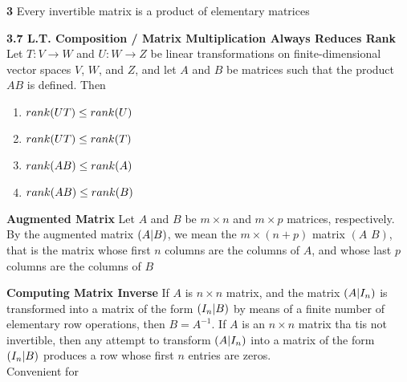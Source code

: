 \documentclass[11pt]{article}
\begin{document}
\begin{corollary*}
    \textbf{3} Every invertible matrix is a product of elementary matrices
\end{corollary*}

\begin{theorem*}
    \textbf{3.7 L.T. Composition / Matrix Multiplication Always Reduces Rank} \\
    Let $T:V\to W$ and $U:W\to Z$ be linear transformations on finite-dimensional vector spaces $V$, $W$, and $Z$, and let $A$ and $B$ be matrices such that the product $AB$ is defined. Then 
    \begin{enumerate}
        \item $rank(UT)\leq rank(U)$
        \item $rank(UT)\leq rank(T)$
        \item $rank(AB)\leq rank(A)$
        \item $rank(AB)\leq rank(B)$
    \end{enumerate}
\end{theorem*}

\begin{defn*}
    \textbf{Augmented Matrix} Let $A$ and $B$ be $m\times n$ and $m\times p$ matrices, respectively. By the augmented matrix $(A|B)$, we mean the $m\times (n+p)$ matrix $(A\,\,B)$, that is the matrix whose first $n$ columns are the columns of $A$, and whose last $p$ columns are the columns of $B$
\end{defn*}

\begin{defn*}
    \textbf{Computing Matrix Inverse} If $A$ is $n\times n$ matrix, and the matrix $(A|I_n)$ is transformed into a matrix of the form $(I_n|B)$ by means of a finite number of elementary row operations, then $B = A^{-1}$. If $A$ is an $n\times n$ matrix tha tis not invertible, then any attempt to transform $(A|I_n)$ into a matrix of the form $(I_n|B)$ produces a row whose first $n$ entries are zeros. \\
    Convenient for 
\end{defn*}



\end{document}
